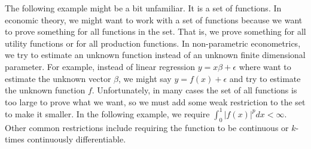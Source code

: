 \documentclass[12pt,reqno]{amsart}
\theoremstyle{definition}
\begin{document}
The following example might be a bit unfamiliar. It is a set of
functions. In economic theory, we might want to work with a set of
functions because we want to prove something for all functions in the
set. That is, we prove something for all utility functions or for all
production functions. In non-parametric econometrics, we try to
estimate an unknown function instead of an unknown finite dimensional
parameter. For example, instead of linear regression $y = x\beta +
\epsilon$ where want to estimate the unknown vector $\beta$, we might
say $y = f(x) + \epsilon$ and try to estimate the unknown function
$f$. Unfortunately, in many cases the set of all functions is too
large to prove what we want, so we must add some weak restriction to
the set to make it smaller. In the following example, we require
$\int_0^1 |f(x)|^p dx < \infty$. Other common restrictions include
requiring the function to be continuous or $k$-times continuously
differentiable.
\end{document}
